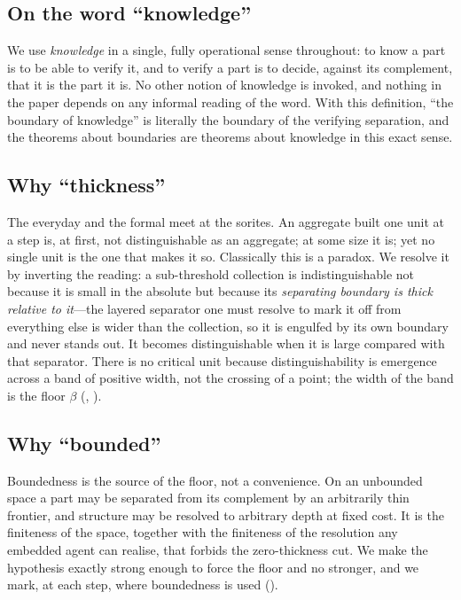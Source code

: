 \documentclass[11pt,twocolumn,a4paper]{article}
\theoremstyle{thmstyle}
\theoremstyle{definition}
\theoremstyle{remark}
\newcommand{\thick}{\beta}
\begin{document}
\subsection{On the word ``knowledge''}

We use \emph{knowledge} in a single, fully operational sense throughout: to
know a part is to be able to verify it, and to verify a part is to decide,
against its complement, that it is the part it is. No other notion of
knowledge is invoked, and nothing in the paper depends on any informal
reading of the word. With this definition, ``the boundary of knowledge'' is
literally the boundary of the verifying separation, and the theorems about
boundaries are theorems about knowledge in this exact sense.

\subsection{Why ``thickness''}

The everyday and the formal meet at the sorites. An aggregate built one unit
at a step is, at first, not distinguishable as an aggregate; at some size it
is; yet no single unit is the one that makes it so. Classically this is a
paradox. We resolve it by inverting the reading: a sub-threshold collection is
indistinguishable not because it is small in the absolute but because its
\emph{separating boundary is thick relative to it}---the layered separator one
must resolve to mark it off from everything else is wider than the collection,
so it is engulfed by its own boundary and never stands out. It becomes
distinguishable when it is large compared with that separator. There is no
critical unit because distinguishability is emergence across a band of
positive width, not the crossing of a point; the width of the band is the
floor $\thick$ (, ).

\subsection{Why ``bounded''}

Boundedness is the source of the floor, not a convenience. On an unbounded
space a part may be separated from its complement by an arbitrarily thin
frontier, and structure may be resolved to arbitrary depth at fixed cost. It
is the finiteness of the space, together with the finiteness of the resolution
any embedded agent can realise, that forbids the zero-thickness cut. We make
the hypothesis exactly strong enough to force the floor and no stronger, and
we mark, at each step, where boundedness is used ().
\end{document}
